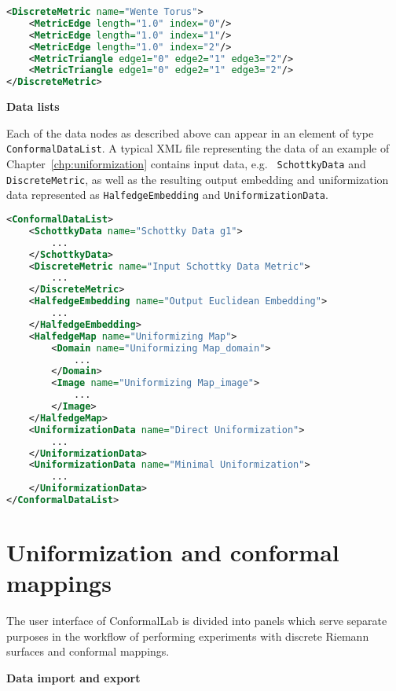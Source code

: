 \documentclass[Thesis.tex]{subfiles}
\begin{document}
\begin{lstlisting}[label=lst:discretemetric_xml, caption={
A Wente torus given by a discrete metric. Vertices are given implicitly by following the order of triangle glueing.}, numbers=none, language=XML, captionpos=b]
<DiscreteMetric name="Wente Torus">
	<MetricEdge length="1.0" index="0"/>
	<MetricEdge length="1.0" index="1"/>
	<MetricEdge length="1.0" index="2"/>
	<MetricTriangle edge1="0" edge2="1" edge3="2"/>
	<MetricTriangle edge1="0" edge2="1" edge3="2"/>
</DiscreteMetric>
\end{lstlisting}

{\bf Data lists}

Each of the data nodes as described above can appear in an element of type {\tt
ConformalDataList}. A typical XML file representing the data of an example of
Chapter~\ref{chp:uniformization} contains input data, e.g. {\tt
SchottkyData} and {\tt DiscreteMetric}, as well as the resulting output
embedding and uniformization data represented as {\tt HalfedgeEmbedding} and
{\tt UniformizationData}.

\begin{lstlisting}[label=lst:datalist_xml, caption={A list of data XML nodes as the result of an algorithm calculating the Fuchsian uniformization of a genus $1$ Riemann surface given by Schottky data.}, numbers=none, language=XML, captionpos=b]
<ConformalDataList>
	<SchottkyData name="Schottky Data g1">
		...
	</SchottkyData>
	<DiscreteMetric name="Input Schottky Data Metric">
		...
	</DiscreteMetric>
	<HalfedgeEmbedding name="Output Euclidean Embedding">
		...
	</HalfedgeEmbedding>
	<HalfedgeMap name="Uniformizing Map">
		<Domain name="Uniformizing Map_domain">
			...
		</Domain>
		<Image name="Uniformizing Map_image">
			...
		</Image>
	</HalfedgeMap>
	<UniformizationData name="Direct Uniformization">
		...
	</UniformizationData>
	<UniformizationData name="Minimal Uniformization">
		...
	</UniformizationData>
</ConformalDataList>
\end{lstlisting}

\section{Uniformization and conformal mappings} \label{sec:conformallab_ui} The
user interface of {\sc ConformalLab} is divided into panels which serve
separate purposes in the workflow of performing experiments with discrete
Riemann surfaces and conformal mappings.


{\bf Data import and export}
\end{document}
